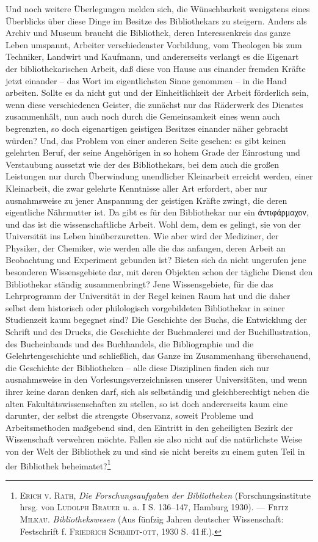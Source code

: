 \documentclass[a4paper,
fontsize=11pt,
oneside,
numbers=noperiodatend,
parskip=half-,
bibliography=totoc,
final
]{scrartcl}
\begin{document}
Und noch weitere Überlegungen melden sich, die Wünschbarkeit wenigstens
eines Überblicks über diese Dinge im Besitze des Bibliothekars zu
steigern. Anders als Archiv und Museum braucht die Bibliothek, deren
Interessenkreis das ganze Leben umspannt, Arbeiter verschiedenster
Vorbildung, vom Theologen bis zum Techniker, Landwirt und Kaufmann, und
andererseits verlangt es die Eigenart der bibliothekarischen Arbeit, daß
diese von Hause aus einander fremden Kräfte jetzt einander -- das Wort
im eigentlichsten Sinne genommen -- in die Hand arbeiten. Sollte es da
nicht gut und der Einheitlichkeit der Arbeit förderlich sein, wenn diese
verschiedenen Geister, die zunächst nur das Räderwerk des Dienstes
zusammenhält, nun auch noch durch die Gemeinsamkeit eines wenn auch
begrenzten, so doch eigenartigen geistigen Besitzes einander näher
gebracht würden? Und, das Problem von einer anderen Seite gesehen: es
gibt keinen gelehrten Beruf, der seine Angehörigen in so hohem Grade der
Einrostung und Verstaubung aussetzt wie der des Bibliothekars, bei dem
auch die großen Leistungen nur durch Überwindung unendlicher Kleinarbeit
erreicht werden, einer Kleinarbeit, die zwar gelehrte Kenntnisse aller
Art erfordert, aber nur ausnahmsweise zu jener Anspannung der geistigen
Kräfte zwingt, die deren eigentliche Nährmutter ist. Da gibt es für den
Bibliothekar nur ein \textgreek{άντιφάρμαχον}, und das ist die wissenschaftliche
Arbeit. Wohl dem, dem es gelingt, sie von der Universität ins Leben
hinüberzuretten. Wie aber wird der Mediziner, der Physiker, der
Chemiker, wie werden alle die das anfangen, deren Arbeit an Beobachtung
und Experiment gebunden ist? Bieten sich da nicht ungerufen jene
besonderen Wissensgebiete dar, mit deren Objekten schon der tägliche
Dienst den Bibliothekar ständig zusammenbringt? Jene Wissensgebiete, für
die das Lehrprogramm der Universität in der Regel keinen Raum hat und
die daher selbst dem historisch oder philologisch vorgebildeten
Bibliothekar in seiner Studienzeit kaum begegnet sind? Die Geschichte
des Buchs, die Entwicklung der Schrift und des Drucks, die Geschichte
der Buchmalerei und der Buchillustration, des Bucheinbands und des
Buchhandels, die Bibliographie und die Gelehrtengeschichte und
schließlich, das Ganze im Zusammenhang überschauend, die Geschichte der
Bibliotheken -- alle diese Disziplinen finden sich nur ausnahmsweise in
den Vorlesungsverzeichnissen unserer Universitäten, und wenn ihrer keine
daran denken darf, sich als selbständig und gleichberechtigt neben die
alten Fakultätswissenschaften zu stellen, so ist doch andererseits kaum
eine darunter, der selbst die strengste Observanz, soweit Probleme und
Arbeitsmethoden maßgebend sind, den Eintritt in den geheiligten Bezirk
der Wissenschaft verwehren möchte. Fallen sie also nicht auf die
natürlichste Weise von der Welt der Bibliothek zu und sind sie nicht
bereits zu einem guten Teil in der Bibliothek beheimatet?\footnote{\textsc{Erich
  v. Rath}, \emph{Die Forschungsaufgaben der Bibliotheken}
  (Forschungsinstitute hrsg. von \textsc{Ludolph Brauer} u. a. I S.
  136--147, Hamburg 1930). --- \textsc{Fritz Milkau}.
  \emph{Bibliothekswesen} (Aus fünfzig Jahren deutscher Wissenschaft:
  Festschrift f. \textsc{Friedrich Schmidt-ott}, 1930 S. 41\,ff.).}
\end{document}
